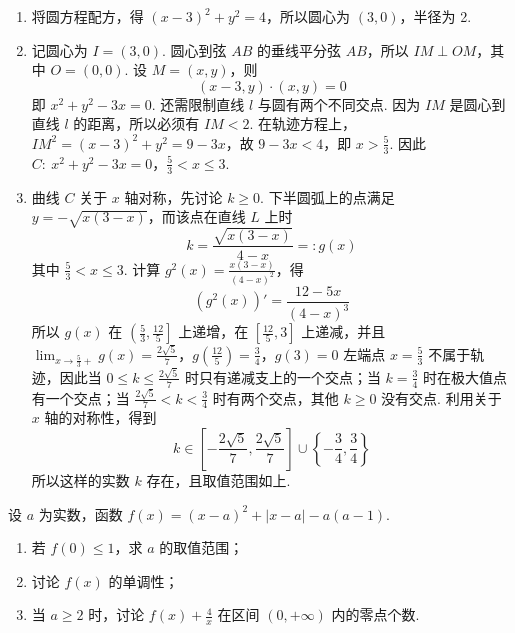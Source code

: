 \begin{solution}
\begin{enumerate}
\item 将圆方程配方，得 \((x-3)^2+y^2=4\)，所以圆心为 \((3,0)\)，半径为 2.

\item 记圆心为 \(I=(3,0)\). 圆心到弦 \(AB\) 的垂线平分弦 \(AB\)，所以 \(IM\perp OM\)，其中 \(O=(0,0)\). 设 \(M=(x,y)\)，则
\[
(x-3,y)\cdot(x,y)=0
\]
即 \(x^2+y^2-3x=0\). 还需限制直线 \(l\) 与圆有两个不同交点. 因为 \(IM\) 是圆心到直线 \(l\) 的距离，所以必须有 \(IM<2\). 在轨迹方程上，\(IM^2=(x-3)^2+y^2=9-3x\)，故 \(9-3x<4\)，即 \(x>\frac53\). 因此
\(C:\ x^2+y^2-3x=0\)，\(\frac53<x\leqslant3\).

\item 曲线 \(C\) 关于 \(x\) 轴对称，先讨论 \(k\geqslant0\). 下半圆弧上的点满足 \(y=-\sqrt{x(3-x)}\)，而该点在直线 \(L\) 上时
\[
k=\frac{\sqrt{x(3-x)}}{4-x}=:g(x)
\]
其中 \(\frac53<x\leqslant3\).
计算 \(g^2(x)=\frac{x(3-x)}{(4-x)^2}\)，得
\[
\left(g^2(x)\right)'=\frac{12-5x}{(4-x)^3}
\]
所以 \(g(x)\) 在 \(\left(\frac53,\frac{12}{5}\right]\) 上递增，在 \(\left[\frac{12}{5},3\right]\) 上递减，并且
\(\lim_{x\to\frac53+}g(x)=\frac{2\sqrt5}{7}\)，\(g\left(\frac{12}{5}\right)=\frac34\)，\(g(3)=0\)
左端点 \(x=\frac53\) 不属于轨迹，因此当 \(0\leqslant k\leqslant\frac{2\sqrt5}{7}\) 时只有递减支上的一个交点；当 \(k=\frac34\) 时在极大值点有一个交点；当 \(\frac{2\sqrt5}{7}<k<\frac34\) 时有两个交点，其他 \(k\geqslant0\) 没有交点. 利用关于 \(x\) 轴的对称性，得到
\[
k\in\left[-\frac{2\sqrt5}{7},\frac{2\sqrt5}{7}\right]\cup\left\{-\frac34,\frac34\right\}
\]
所以这样的实数 \(k\) 存在，且取值范围如上.
\end{enumerate}
\end{solution}

\begin{problem}
设 \(a\) 为实数，函数 \(f(x) = (x - a)^2 + |x - a| - a(a - 1)\).
\begin{enumerate}
\item 若 \( f(0) \leqslant 1 \)，求 \( a \) 的取值范围；
\item 讨论 \( f(x) \) 的单调性；
\item 当 \(a \geqslant 2\) 时，讨论 \(f(x) + \frac{4}{x}\) 在区间 \((0, +\infty)\) 内的零点个数.
\end{enumerate}
\end{problem}

